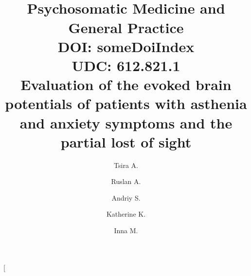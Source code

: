 \documentclass[twocolumn]{article}
\date{}
\begin{document}
\title{
\\[-1.5cm]
\bfseries \qquad Psychosomatic Medicine and General Practice\\[0.5cm]{
\flushleft\small{DOI: someDoiIndex\hfill }\\[0.4cm]
\flushleft\small{UDC: 612.821.1\hfill }\\[0.4cm]}{
\LARGE \bfseries Evaluation of the evoked brain potentials of patients with asthenia and anxiety symptoms and the partial lost of sight
}}
\author[1,2,3]{Tsira A.}
\author[2,3]{Ruslan A.}
\author[3]{Andriy S.}
\author[4]{Katherine K.}
\author[4]{Inna M.}
\twocolumn[
\end{document}
